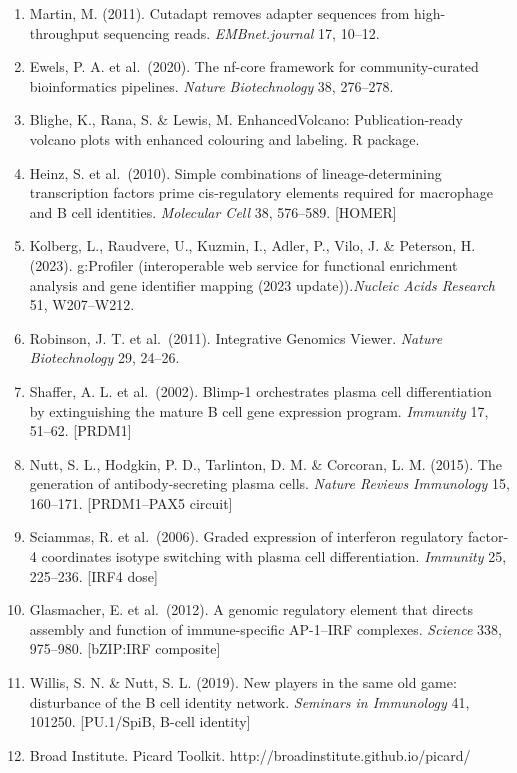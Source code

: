 \documentclass[
  11pt,
  a4paper,
]{article}
\begin{document}
\begin{enumerate}
\item
  Martin, M. (2011). Cutadapt removes adapter sequences from
  high-throughput sequencing reads. \emph{EMBnet.journal} 17, 10--12.
\item
  Ewels, P. A. et al.~(2020). The nf-core framework for
  community-curated bioinformatics pipelines. \emph{Nature
  Biotechnology} 38, 276--278.
\item
  Blighe, K., Rana, S. \& Lewis, M. EnhancedVolcano: Publication-ready
  volcano plots with enhanced colouring and labeling. R package.
\item
  Heinz, S. et al.~(2010). Simple combinations of lineage-determining
  transcription factors prime cis-regulatory elements required for
  macrophage and B cell identities. \emph{Molecular Cell} 38, 576--589.
  {[}HOMER{]}
\item
  Kolberg, L., Raudvere, U., Kuzmin, I., Adler, P., Vilo, J. \&
  Peterson, H. (2023). g:Profiler (interoperable web service for
  functional enrichment analysis and gene identifier mapping (2023
  update)).\emph{Nucleic Acids Research} 51, W207--W212.
\item
  Robinson, J. T. et al.~(2011). Integrative Genomics Viewer.
  \emph{Nature Biotechnology} 29, 24--26.
\item
  Shaffer, A. L. et al.~(2002). Blimp-1 orchestrates plasma cell
  differentiation by extinguishing the mature B cell gene expression
  program. \emph{Immunity} 17, 51--62. {[}PRDM1{]}
\item
  Nutt, S. L., Hodgkin, P. D., Tarlinton, D. M. \& Corcoran, L. M.
  (2015). The generation of antibody-secreting plasma cells.
  \emph{Nature Reviews Immunology} 15, 160--171. {[}PRDM1--PAX5
  circuit{]}
\item
  Sciammas, R. et al.~(2006). Graded expression of interferon regulatory
  factor-4 coordinates isotype switching with plasma cell
  differentiation. \emph{Immunity} 25, 225--236. {[}IRF4 dose{]}
\item
  Glasmacher, E. et al.~(2012). A genomic regulatory element that
  directs assembly and function of immune-specific AP-1--IRF complexes.
  \emph{Science} 338, 975--980. {[}bZIP:IRF composite{]}
\item
  Willis, S. N. \& Nutt, S. L. (2019). New players in the same old game:
  disturbance of the B cell identity network. \emph{Seminars in
  Immunology} 41, 101250. {[}PU.1/SpiB, B-cell identity{]}
\item
  Broad Institute. Picard Toolkit.
  http://broadinstitute.github.io/picard/
\end{enumerate}
\end{document}
